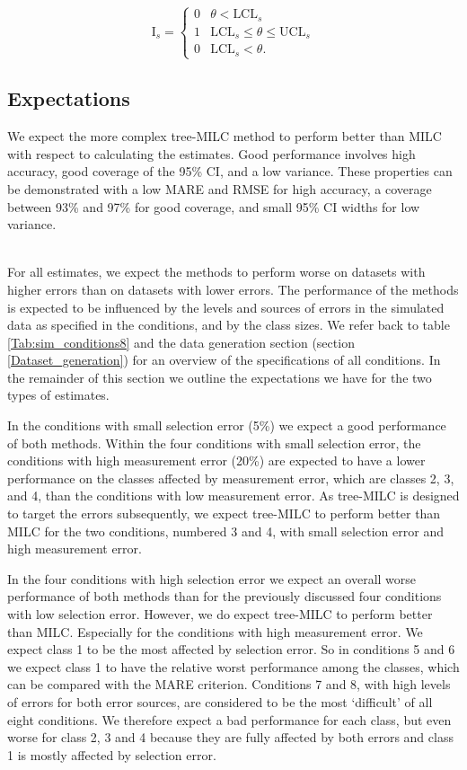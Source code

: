 \documentclass[a4paper, 11pt]{article} %
\begin{document}
\[ \text{I}_{s}= \begin{cases} 
      0 & \theta < \text{LCL}_s\\
      1 & \text{LCL}_s \leq \theta \leq \text{UCL}_s \\
      0 & \text{LCL}_s< \theta .
   \end{cases}
\]

\subsection{Expectations}
We expect the more complex tree-MILC method to perform better than MILC with respect to calculating the estimates. Good performance involves high accuracy, good coverage of the 95\% CI, and a low variance. These properties can be demonstrated with a low MARE and RMSE for high accuracy, a coverage between 93\% and 97\% for good coverage, and small 95\% CI widths for low variance. 

\\For all estimates, we expect the methods to perform worse on datasets with higher errors than on datasets with lower errors. The performance of the methods is expected to be influenced by the levels and sources of errors in the simulated data as specified in the conditions, and by the class sizes. We refer back to table \ref{Tab:sim_conditions8} and the data generation section (section \ref{Dataset_generation}) for an overview of the specifications of all conditions. In the remainder of this section we outline the expectations we have for the two types of estimates.

In the conditions with small selection error (5\%) we expect a good performance of both methods. Within the four conditions with small selection error, the conditions with high measurement error (20\%) are expected to have a lower performance on the classes affected by measurement error, which are classes 2, 3, and 4, than the conditions with low measurement error. As tree-MILC is designed to target the errors subsequently, we expect tree-MILC to perform better than MILC for the two conditions, numbered 3 and 4, with small selection error and high measurement error.

In the four conditions with high selection error we expect an overall worse performance of both methods than for the previously discussed four conditions with low selection error. However, we do expect tree-MILC to perform better than MILC. Especially for the conditions with high measurement error. We expect class 1 to be the most affected by selection error. So in conditions 5 and 6 we expect class 1 to have the relative worst performance among the classes, which can be compared with the MARE criterion. Conditions 7 and 8, with high levels of errors for both error sources, are considered to be the most `difficult' of all eight conditions. We therefore expect a bad performance for each class, but even worse for class 2, 3 and 4 because they are fully affected by both errors and class 1 is mostly affected by selection error.
\end{document}
